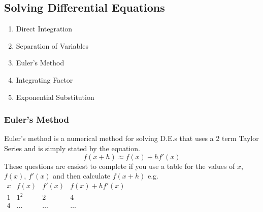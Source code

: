 \documentclass[12pt] {article}
\begin{document}
\subsection*{Solving Differential Equations}
\begin{enumerate} 
    \item Direct Integration
    \item Separation of Variables 
    \item Euler's Method    
    \item Integrating Factor
    \item Exponential Substitution
\end{enumerate}

\subsubsection*{Euler's Method}
Euler's method is a numerical method for solving D.E.s that uses a 2 term Taylor Series 
and is simply stated by the equation.
\begin{equation*}
  f(x+h) \approx f(x) + hf'(x)
\end{equation*}
These questions are easiest to complete if you use a table for the values 
of $x$, $f(x)$, $f'(x)$ and then calculate $f(x+h)$ e.g.
\vspace{1em}
\newline
$\begin{array}{c|c|c|c}
  x & f(x) & f'(x) & f(x) + hf'(x) \\
  1 & 1^2 & 2 & 4 \\
  4 & \dots & \dots & \dots \\
\end{array}$
\end{document}
